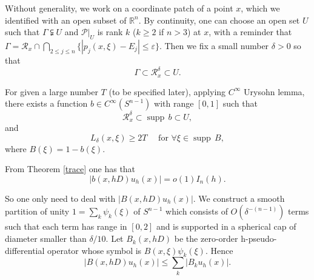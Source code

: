 \documentclass[12pt,reqno]{amsart}
\renewcommand{\epsilon}{\varepsilon}
\newcommand{\supp}{{\operatorname{supp\,}}}
\numberwithin{equation}{section}
\begin{document}
Without generality, we work on a coordinate patch of a point $x$, which we identified with an open subset of $\mathbb{R}^n$. By continuity, one can choose an open set $U$ such that $\Gamma\subsetneqq U$ and $\mathcal{P}|_{U}$ is rank $k$ ($k\geq 2$ if $n>3$) at $x$, with a reminder that $\Gamma=\mathcal{R}_x\cap \bigcap\limits_{2\leq j \leq n}\{|p_j(x,\xi)-E_j|\leq \epsilon\}$. Then we fix a small number $\delta>0$ so that 
\begin{equation}
\Gamma\subset \mathcal{R}_x^\delta\subset U.
\end{equation}

For given a large number $T$ (to be specified later), applying $C^\infty$ Urysohn lemma, there exists a function $b\in C^\infty(S^{n-1})$ with range $[0,1]$ such that 
\begin{equation}
\mathcal{R}_x^\delta\subset \supp{b}\subset U,
\end{equation}
and
\begin{equation}
    L_\delta(x,\xi)\geq 2T \quad \text{ for } \forall \xi \in \supp B,
\end{equation}
where $B(\xi)=1-b(\xi)$. 

From Theorem \ref{trace} one has that
\begin{equation}
|b(x, hD)u_h(x)|=o(1)I_n(h).
\end{equation}

So one only need to deal with $|B(x, hD) u_h(x)|$. We construct a smooth partition of unity $1=\sum_k \psi_k(\xi)$ of $S^{n-1}$ which consists of $O(\delta^{-(n-1)})$ terms such that each term has range in $[0,2]$ and is supported in a spherical cap of diameter smaller than $\delta/10$. Let $B_k(x,hD)$ be the zero-order h-pseudo-differential operator whose symbol is $B(x,\xi)\psi_k(\xi)$. Hence
\begin{equation}\label{terms}
    |B(x, hD) u_h(x)| \leq \sum_k \Big| B_k u_h (x) \Big|.
\end{equation}
\end{document}
